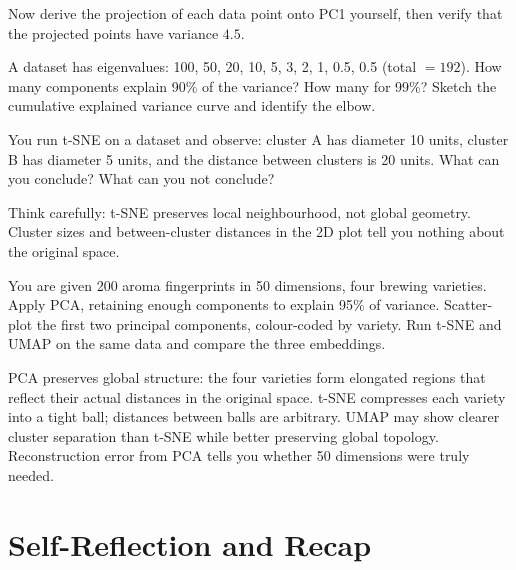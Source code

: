 Now derive the projection of each data point onto PC1 yourself, then verify that the projected points have variance $4.5$.

\vspace{2.5em}

 A dataset has eigenvalues: 100, 50, 20, 10, 5, 3, 2, 1, 0.5, 0.5 (total ${=}192$).
How many components explain 90\% of the variance?
How many for 99\%?
Sketch the cumulative explained variance curve and identify the elbow.


\vspace{2.5em}

 You run t-SNE on a dataset and observe: cluster A has diameter 10 units, cluster B has diameter 5 units, and the distance between clusters is 20 units.
What can you conclude?
What can you not conclude?

Think carefully: t-SNE preserves local neighbourhood, not global geometry.
Cluster sizes and between-cluster distances in the 2D plot tell you nothing about the original space.




You are given 200 aroma fingerprints in 50 dimensions, four brewing varieties.
Apply PCA, retaining enough components to explain 95\% of variance.
Scatter-plot the first two principal components, colour-coded by variety.
Run t-SNE and UMAP on the same data and compare the three embeddings.

PCA preserves global structure: the four varieties form elongated regions that reflect their actual distances in the original space.
t-SNE compresses each variety into a tight ball; distances between balls are arbitrary.
UMAP may show clearer cluster separation than t-SNE while better preserving global topology.
Reconstruction error from PCA tells you whether 50 dimensions were truly needed.


\section{Self-Reflection and Recap}

